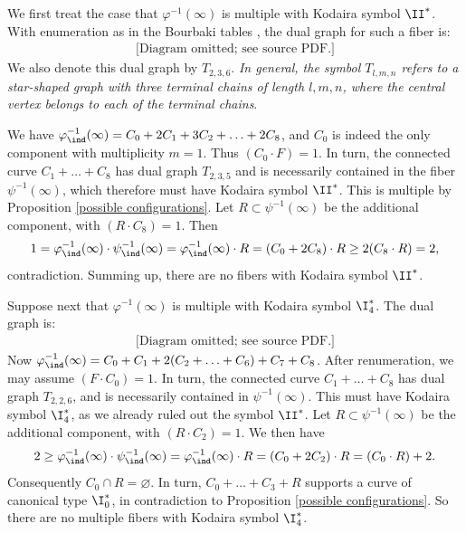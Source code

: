 We first treat the case   that
$\varphi^{-1}(\infty)$ is multiple with Kodaira symbol $\II^*$. With enumeration as in the Bourbaki tables
\cite{LIE-4-6}, the dual graph for such a  fiber is:
\begin{equation*}
\begin{gathered}
\text{[Diagram omitted; see source PDF.]}
\end{gathered}
\end{equation*}
We also denote this dual graph by $T_{2,3,6}$. \emph{In general, the symbol $T_{l,m,n}$ refers to a star-shaped graph
with three terminal chains of length $l,m,n$, where the central vertex belongs to each of the terminal chains}.

We have $\varphi^{-1}_\ind(\infty)=C_0+2C_1+3C_2+\ldots +2C_8$, and $C_0$ is indeed the only component  with multiplicity $m=1$.
Thus  $(C_0\cdot F)=1$.
In turn, the connected curve $C_1+\ldots+C_8$ has dual graph $T_{2,3,5}$ and is necessarily contained in
the fiber $\psi^{-1}(\infty)$, which therefore must have Kodaira symbol $\II^*$. This is multiple by
Proposition \ref{possible configurations}.
Let $R\subset\psi^{-1}(\infty)$ be the additional component, with $(R\cdot C_8)=1$.
Then
$$
1=\varphi^{-1}_\ind(\infty)\cdot\psi^{-1}_\ind(\infty) =  \varphi^{-1}_\ind(\infty)\cdot R= (C_0+2C_8)\cdot R\geq 2(C_8\cdot R)=2,
$$
contradiction. Summing up, there are no fibers with Kodaira symbol $\II^*$.

Suppose next that $\varphi^{-1}(\infty)$ is multiple with Kodaira symbol $\I_4^*$.
The dual graph is:
\begin{equation*}
\begin{gathered}
\text{[Diagram omitted; see source PDF.]}
\end{gathered}
\end{equation*}
Now $\varphi^{-1}_\ind(\infty) = C_0+C_1+2(C_2+\ldots+C_6)+C_7+C_8$.
After renumeration, we may assume $(F\cdot C_0)=1$.
In turn, the connected curve $C_1+\ldots+C_8$ has dual graph $T_{2,2,6}$, and is necessarily contained
in $\psi^{-1}(\infty)$. This must have Kodaira symbol $\I_4^*$, as we already ruled out the symbol $\II^*$.
Let $R\subset \psi^{-1}(\infty)$ be the additional component, with $(R\cdot C_2)=1$.
We then have
$$
2\geq \varphi^{-1}_\ind(\infty)\cdot \psi^{-1}_\ind(\infty) = \varphi^{-1}_\ind(\infty)\cdot R = (C_0+2C_2)\cdot R=(C_0\cdot R)+2.
$$
Consequently $C_0\cap R=\varnothing$. In turn, $C_0+\ldots+C_3+R$ supports a curve of canonical type $\I_0^*$,
in contradiction to Proposition \ref{possible configurations}.
So there are no multiple fibers with Kodaira symbol $\I_4^*$.

